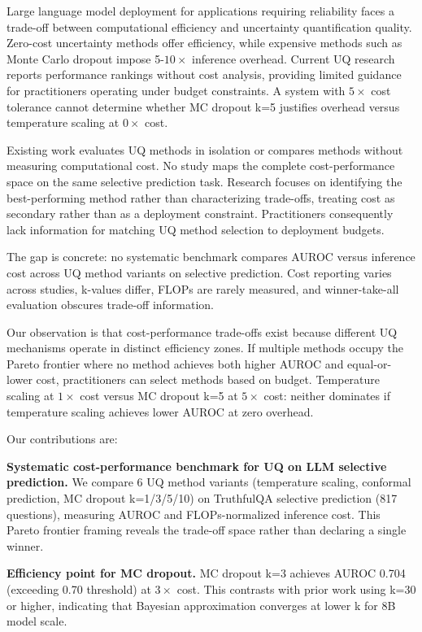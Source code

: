 
Large language model deployment for applications requiring reliability faces a trade-off between computational efficiency and uncertainty quantification quality. Zero-cost uncertainty methods offer efficiency, while expensive methods such as Monte Carlo dropout impose 5-$10\times$ inference overhead. Current UQ research reports performance rankings without cost analysis, providing limited guidance for practitioners operating under budget constraints. A system with $5\times$ cost tolerance cannot determine whether MC dropout k=5 justifies overhead versus temperature scaling at $0\times$ cost.

Existing work evaluates UQ methods in isolation or compares methods without measuring computational cost. No study maps the complete cost-performance space on the same selective prediction task. Research focuses on identifying the best-performing method rather than characterizing trade-offs, treating cost as secondary rather than as a deployment constraint. Practitioners consequently lack information for matching UQ method selection to deployment budgets.

The gap is concrete: no systematic benchmark compares AUROC versus inference cost across UQ method variants on selective prediction. Cost reporting varies across studies, k-values differ, FLOPs are rarely measured, and winner-take-all evaluation obscures trade-off information.

Our observation is that cost-performance trade-offs exist because different UQ mechanisms operate in distinct efficiency zones. If multiple methods occupy the Pareto frontier where no method achieves both higher AUROC and equal-or-lower cost, practitioners can select methods based on budget. Temperature scaling at $1\times$ cost versus MC dropout k=5 at $5\times$ cost: neither dominates if temperature scaling achieves lower AUROC at zero overhead.

Our contributions are:

\textbf{Systematic cost-performance benchmark for UQ on LLM selective prediction.} We compare 6 UQ method variants (temperature scaling, conformal prediction, MC dropout k=1/3/5/10) on TruthfulQA selective prediction (817 questions), measuring AUROC and FLOPs-normalized inference cost. This Pareto frontier framing reveals the trade-off space rather than declaring a single winner.

\textbf{Efficiency point for MC dropout.} MC dropout k=3 achieves AUROC 0.704 (exceeding 0.70 threshold) at $3\times$ cost. This contrasts with prior work using k=30 or higher, indicating that Bayesian approximation converges at lower k for 8B model scale.

